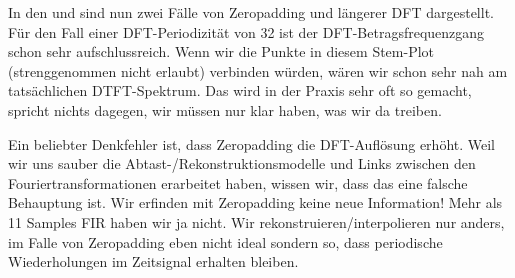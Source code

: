 \begin{Loesung}
In den  und 
sind nun zwei Fälle von Zeropadding und längerer DFT dargestellt.
Für den Fall einer DFT-Periodizität von 32 ist der DFT-Betragsfrequenzgang
schon sehr aufschlussreich. Wenn wir die Punkte in diesem Stem-Plot (strenggenommen
nicht erlaubt) verbinden würden, wären wir schon sehr nah am tatsächlichen
DTFT-Spektrum. Das wird in der Praxis sehr oft so gemacht, spricht nichts dagegen,
wir müssen nur klar haben, was wir da treiben.

Ein beliebter Denkfehler ist, dass Zeropadding die DFT-Auflösung erhöht.
Weil wir uns sauber die Abtast-/Rekonstruktionsmodelle und Links zwischen den
Fouriertransformationen erarbeitet haben, wissen wir, dass das eine
falsche Behauptung ist.
Wir erfinden mit Zeropadding keine neue Information! Mehr als 11 Samples FIR
haben wir ja nicht.
Wir rekonstruieren/interpolieren
nur anders, im Falle von Zeropadding eben nicht ideal sondern so,
dass periodische Wiederholungen im Zeitsignal erhalten bleiben.

\end{Loesung}




